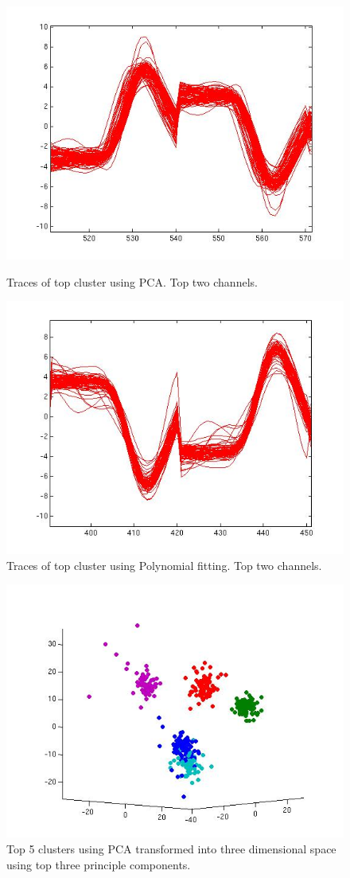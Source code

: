\documentclass[conference]{IEEEtran}
\begin{document}
\begin{figure}
\centering
\includegraphics[width=0.7\linewidth]{traces/clustertrace_pca_front.jpg}
\caption{Traces of top cluster using PCA. Top two channels.}
\includegraphics[width=0.7\linewidth]{traces/clustertrace_poly_front.jpg}
\caption{Traces of top cluster using Polynomial fitting. Top two
  channels.}
\end{figure}

\begin{figure}
\centering
\includegraphics[width=0.7\linewidth]{traces/pca_top5_3d.jpg}
\caption{Top 5 clusters using PCA transformed into three dimensional
  space using top three principle components.}
\end{figure}
\end{document}
